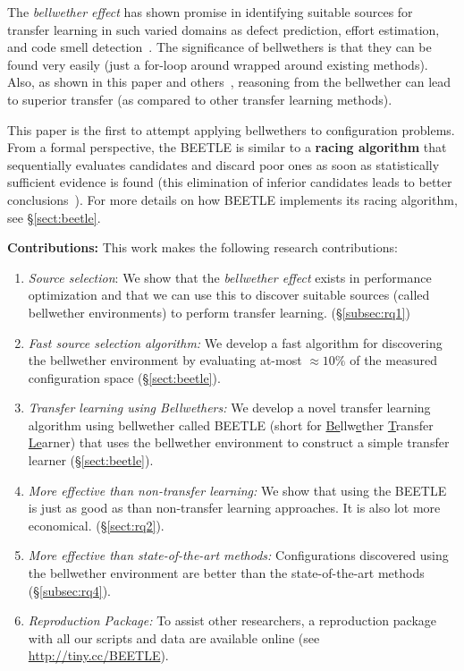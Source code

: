 \documentclass[10pt,journal,compsoc]{IEEEtran}
\newcommand{\tion}[1]{\S\ref{sect:#1}}
\begin{document}
The \textit{bellwether effect} has shown promise in identifying suitable 
sources for transfer learning in such varied domains as defect prediction, 
effort estimation, and code smell detection~\cite{krishna18}.
The significance of bellwethers is that they can be found very easily
(just a for-loop around wrapped around existing methods). Also, as shown in this paper and
others~\cite{krishna16,mensah17a,mensah17b, krishna18}, reasoning from the bellwether can lead to superior transfer (as compared to other transfer learning methods).

This paper is the first to attempt applying bellwethers to configuration problems. 
From a formal perspective, the BEETLE is similar to a  {\bf racing algorithm}
that sequentially evaluates candidates and discard poor ones as soon as statistically sufficient evidence is found (this elimination of inferior candidates leads to better conclusions~\cite{birattari2002racing}).
For more details on how BEETLE implements its racing algorithm, see \tion{beetle}.

\noindent \textbf{Contributions:} This work  makes the  following research contributions: 
\begin{enumerate}[leftmargin=*]
\item \textit{Source selection}: We show that the \textit{bellwether effect} exists in performance optimization and that we can use this to discover suitable sources (called bellwether environments) to perform transfer learning. (\S\ref{subsec:rq1})
\item \textit{Fast source selection algorithm:} We develop a fast algorithm for discovering the bellwether environment by evaluating at-most $\approx10\%$ of the measured configuration space (\S\ref{sect:beetle}).
\item \textit{Transfer learning using Bellwethers:} We develop a novel transfer 
learning algorithm using bellwether called BEETLE (short for  
\underline{Be}llw\underline{e}ther \underline{T}ransfer \underline{Le}arner)
that uses the bellwether environment to construct a simple transfer learner 
(\S\ref{sect:beetle}).
\item \textit{More effective than non-transfer learning: } We show that using the BEETLE is just as good as than non-transfer learning approaches. It is also lot more economical. (\S\ref{sect:rq2}).
\item \textit{More effective than state-of-the-art methods: } Configurations discovered using the bellwether environment are better than the state-of-the-art 
methods~\cite{valov2017transferring, jamshidi2017transfer} (\S\ref{subsec:rq4}).

\item \textit{Reproduction Package: } To assist other researchers, a reproduction package with all our scripts and data are available online (see \url{http://tiny.cc/BEETLE}).
\end{enumerate}
\end{document}
